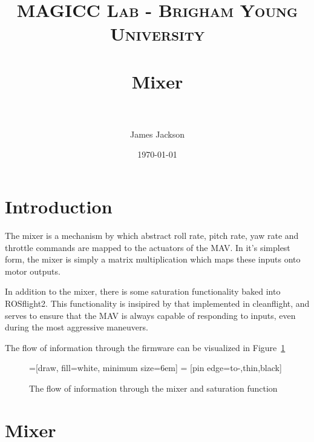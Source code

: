 \documentclass[paper=a4, fontsize=11pt]{scrartcl} %
\title{
\normalfont \normalsize
\textsc{MAGICC Lab - Brigham Young University} \\ [25pt] %
\horrule{0.5pt} \\[0.4cm] %
\huge Mixer \\ %
\horrule{2pt} \\[0.5cm] %
}
\author{James Jackson} %
\date{\normalsize\today} %
\numberwithin{equation}{section} %
\numberwithin{figure}{section} %
\numberwithin{table}{section} %
\begin{document}
\maketitle %


\section{Introduction}

The mixer is a mechanism by which abstract roll rate, pitch rate, yaw rate and throttle commands are mapped to the actuators of the MAV.  In it's simplest form, the mixer is simply a matrix multiplication which maps these inputs onto motor outputs.

In addition to the mixer, there is some saturation functionality baked into ROSflight2.  This functionality is insipired by that implemented in cleanflight, and serves to ensure that the MAV is always capable of responding to inputs, even during the most aggressive maneuvers.

The flow of information through the firmware can be visualized in Figure~\ref{fig:mixer_flow}

\begin{figure}
	\centering
	=[draw, fill=white, minimum size=6em]
	 = [pin edge={to-,thin,black}]

\label{fig:mixer_flow}
\caption{The flow of information through the mixer and saturation function}
\end{figure}

\section{Mixer}
\end{document}
